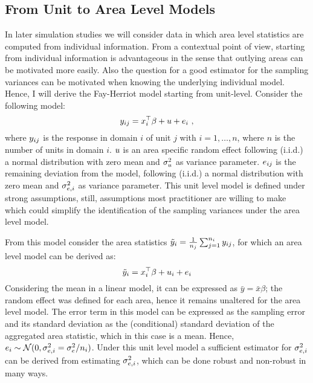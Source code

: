 \subsection{From Unit to Area Level
Models}\label{from-unit-to-area-level-models}

In later simulation studies we will consider data in which area level
statistics are computed from individual information. From a contextual
point of view, starting from individual information is advantageous in
the sense that outlying areas can be motivated more easily. Also the
question for a good estimator for the sampling variances can be
motivated when knowing the underlying individual model. Hence, I will
derive the Fay-Herriot model starting from unit-level. Consider the
following model: \[
y_{ij} = x_i^\top\beta + u + e_i \text{ ,}
\] where $y_{ij}$ is the response in domain $i$ of unit $j$ with
$i = 1, \dots, \si{n}$, where $\si{n}$ is the number of units in domain
$i$. $u$ is an area specific random effect following (i.i.d.) a normal
distribution with zero mean and $\sigma_{u}^2$ as variance parameter.
$e_{ij}$ is the remaining deviation from the model, following (i.i.d.)
a normal distribution with zero mean and $\sigma_{e, i}^2$ as variance parameter.
This unit level model is defined under strong assumptions, still,
assumptions most practitioner are willing to make which could simplify
the identification of the sampling variances under the area level model.

From this model consider the area statistics
$\tilde{y}_i = \frac{1}{n_j} \sum_{j = 1}^{n_i}y_{ij}$, for which an
area level model can be derived as: \[
\tilde{y}_i = x_i^\top\beta + u_i + e_i
\] Considering the mean in a linear model, it can be expressed as
$\bar{y} =  \bar{x}\beta$; the random effect was defined for each area,
hence it remains unaltered for the area level model. The error term in
this model can be expressed as the sampling error and its standard
deviation as the (conditional) standard deviation of the aggregated area
statistic, which in this case is a mean. Hence,
$e_i \sim \mathcal{N}(0, \sigma_{e, i}^2 = \sigma^2_e / n_i)$. Under this unit
level model a sufficient estimator for $\sigma_{e, i}^2$ can be derived from
estimating $\sigma_{e, i}^2$, which can be done robust and non-robust in many
ways.
